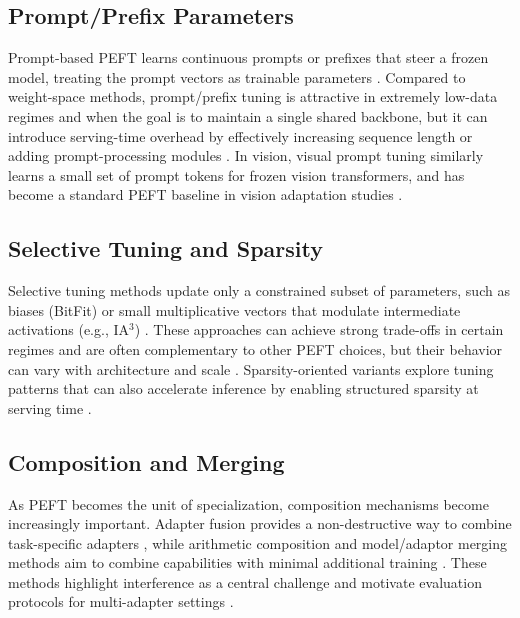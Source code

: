 \documentclass[conference]{IEEEtran}
\begin{document}
\subsection{Prompt/Prefix Parameters}
Prompt-based PEFT learns continuous prompts or prefixes that steer a frozen model, treating the prompt vectors as trainable parameters \cite{li2021prefix,lester2021the}. Compared to weight-space methods, prompt/prefix tuning is attractive in extremely low-data regimes and when the goal is to maintain a single shared backbone, but it can introduce serving-time overhead by effectively increasing sequence length or adding prompt-processing modules \cite{liu2021p,han2024parameter}. In vision, visual prompt tuning similarly learns a small set of prompt tokens for frozen vision transformers, and has become a standard PEFT baseline in vision adaptation studies \cite{jia2022visual,xin2024parameter}.

\subsection{Selective Tuning and Sparsity}
Selective tuning methods update only a constrained subset of parameters, such as biases (BitFit) or small multiplicative vectors that modulate intermediate activations (e.g., IA$^3$) \cite{benzaken2021bitfit,liu2022few}. These approaches can achieve strong trade-offs in certain regimes and are often complementary to other PEFT choices, but their behavior can vary with architecture and scale \cite{he2021towards,chen2023parameter}. Sparsity-oriented variants explore tuning patterns that can also accelerate inference by enabling structured sparsity at serving time \cite{kurtic2023sparse}.

\subsection{Composition and Merging}
As PEFT becomes the unit of specialization, composition mechanisms become increasingly important. Adapter fusion provides a non-destructive way to combine task-specific adapters \cite{pfeiffer2020adapterfusion}, while arithmetic composition and model/adaptor merging methods aim to combine capabilities with minimal additional training \cite{zhang2023composing,he2023mera,yadav2023ties}. These methods highlight interference as a central challenge and motivate evaluation protocols for multi-adapter settings \cite{gauthiercaron2024merging,yadav2024what}.
\end{document}
